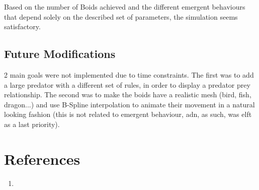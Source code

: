 \documentclass[12pt]{article}
\begin{document}
Based on the number of Boids achieved and the different emergent behaviours that depend solely on the described set of parameters, the simulation seems satisfactory.

\subsection*{Future Modifications}
2 main goals were not implemented due to time constraints. The first was to add a large predator with a different set of rules, in order to display a predator prey relationship. The second was to make the boids have a realistic mesh (bird, fish, dragon...) and use B-Spline interpolation to animate their movement in a natural looking fashion (this is not related to emergent behaviour, adn, as such, was elft as a last priority).

\section*{References}

\begin{enumerate}
	\item
\end{enumerate}
\end{document}
